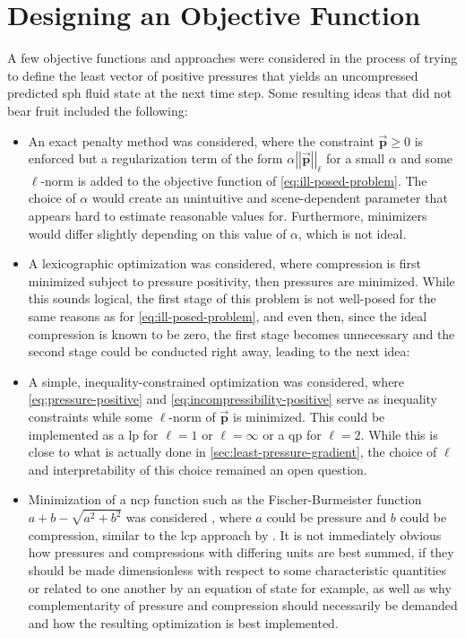 \documentclass[conference]{IEEEtran}
\newcommand\abss[1]{\left|\left|#1\right|\right|}
\newcommand\vek[1]{\vec{\bm{#1}}}
\begin{document}
\section{Designing an Objective Function}\label{sec:pmpg}
A few objective functions and approaches were considered in the process of trying to define the least vector of positive pressures that yields an uncompressed predicted \ac{sph} fluid state at the next time step. Some resulting ideas that did not bear fruit included the following:
\begin{itemize}
  \item An exact penalty method was considered, where the constraint $\vek{p}\geq 0$ is enforced but a regularization term of the form $\alpha \abss{\vek{p}}_\ell$ for a small $\alpha$ and some $\ell$-norm is added to the objective function of \autoref{eq:ill-posed-problem}. The choice of $\alpha$ would create an unintuitive and scene-dependent parameter that appears hard to estimate reasonable values for. Furthermore, minimizers would differ slightly depending on this value of $\alpha$, which is not ideal.
  \item A lexicographic optimization was considered, where compression is first minimized subject to pressure positivity, then pressures are minimized. While this sounds logical, the first stage of this problem is not well-posed for the same reasons as for \autoref{eq:ill-posed-problem}, and even then, since the ideal compression is known to be zero, the first stage becomes unnecessary and the second stage could be conducted right away, leading to the next idea:
  \item A simple, inequality-constrained optimization was considered, where \autoref{eq:pressure-positive} and \autoref{eq:incompressibility-positive} serve as inequality constraints while some $\ell$-norm of $\vek{p}$ is minimized. This could be implemented as a \ac{lp} for $\ell=1$ or $\ell=\infty$ or a \ac{qp} for $\ell=2$. While this is close to what is actually done in \autoref{sec:least-pressure-gradient}, the choice of $\ell$ and interpretability of this choice remained an open question.
  \item Minimization of a \ac{ncp} function such as the Fischer-Burmeister function \cite{burmeister-idee} $a+b-\sqrt{a^2+b^2}$ was considered \cite{fisher-burmeister}, where $a$ could be pressure and $b$ could be compression, similar to the \ac{lcp} approach by \autocite[Probst and Teschner]{unified-pressure-probst}. It is not immediately obvious how pressures and compressions with differing units are best summed, if they should be made dimensionless with respect to some characteristic quantities or related to one another by an equation of state for example, as well as why complementarity of pressure and compression should necessarily be demanded and how the resulting optimization is best implemented.
\end{itemize}
\end{document}
